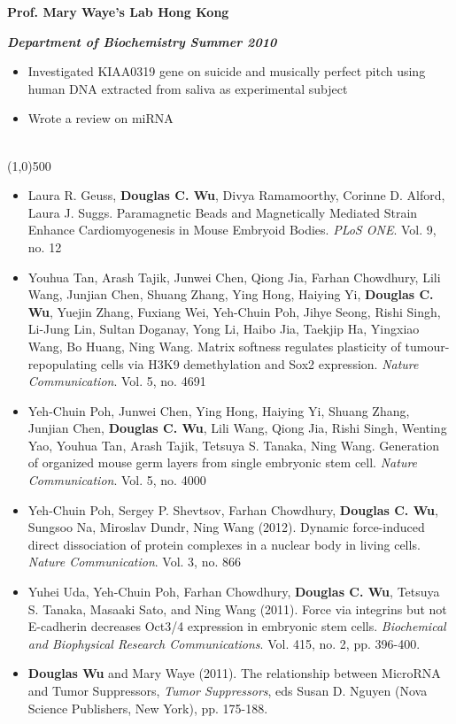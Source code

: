\documentclass[dvips,11pt]{article}
\begin{document}
\noindent\centerline{\bf Prof. Mary Waye's Lab \hfill	Hong Kong}
\noindent\centerline{\textbf{\textit{Department of Biochemistry \hfill Summer 2010}}}
\vspace{-2mm}
\begin{itemize} \itemsep1pt \parskip0pt 
	\setlength{\itemsep}{0pt}
	\item Investigated KIAA0319 gene on suicide and musically perfect pitch using human DNA extracted from saliva as experimental subject 
	\item Wrote a review on miRNA
\end{itemize}
\newpage

\bigskip 
{} \vspace{-1.5mm}
\noindent\\
\vspace{-6mm}
\line(1,0){500}\\
\begin{itemize}
	\setlength{\itemsep}{2pt}
	\item Laura R. Geuss, {\bf Douglas C. Wu}, Divya Ramamoorthy, Corinne D. Alford, Laura J. Suggs. Paramagnetic Beads and Magnetically Mediated Strain Enhance Cardiomyogenesis in Mouse Embryoid Bodies. {\it  PLoS ONE}. Vol. 9, no. 12
	\item Youhua Tan, Arash Tajik, Junwei Chen, Qiong Jia, Farhan Chowdhury, Lili Wang, Junjian Chen, Shuang Zhang, Ying Hong, Haiying Yi, {\bf Douglas C. Wu}, Yuejin Zhang, Fuxiang Wei, Yeh-Chuin Poh, Jihye Seong, Rishi Singh, Li-Jung Lin, Sultan Doganay, Yong Li, Haibo Jia, Taekjip Ha, Yingxiao Wang, Bo Huang, Ning Wang. Matrix softness regulates plasticity of tumour-repopulating cells via H3K9 demethylation and Sox2 expression. {\it Nature Communication}. Vol. 5, no. 4691
 	 \item Yeh-Chuin Poh, Junwei Chen, Ying Hong, Haiying Yi, Shuang Zhang, Junjian Chen, {\bf Douglas C. Wu}, Lili Wang, Qiong Jia, Rishi Singh, Wenting Yao, Youhua Tan, Arash Tajik, Tetsuya S. Tanaka, Ning Wang. Generation of organized mouse germ layers from single embryonic stem cell. {\it Nature Communication}. Vol. 5, no. 4000
	\item Yeh-Chuin Poh, Sergey P. Shevtsov, Farhan Chowdhury, { \bf Douglas C. Wu}, Sungsoo Na, Miroslav Dundr, Ning Wang (2012). Dynamic force-induced direct dissociation of protein complexes in a nuclear body in living cells. {\it Nature Communication}. Vol. 3, no. 866
	\item Yuhei Uda, Yeh-Chuin Poh, Farhan Chowdhury, { \bf Douglas C. Wu}, Tetsuya S. Tanaka, Masaaki Sato, and Ning Wang (2011). Force via integrins but not E-cadherin decreases Oct3/4 expression in embryonic stem cells. {\it Biochemical and Biophysical Research Communications}. Vol. 415, no. 2, pp. 396-400. 
	\item {\bf Douglas Wu} and Mary Waye (2011). The relationship between MicroRNA and Tumor Suppressors, {\it Tumor Suppressors}, eds Susan D. Nguyen (Nova Science Publishers, New York), pp. 175-188. 
\end{itemize}
\end{document}
